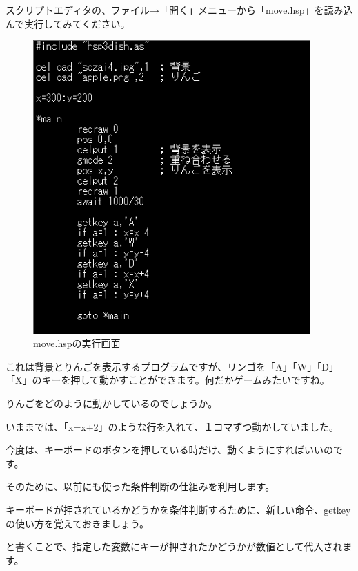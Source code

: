 スクリプトエディタの、ファイル→「開く」メニューから「move.hsp」を読み込んで実行してみてください。


\begin{figure}[H]
    \begin{center}
      \includegraphics[keepaspectratio,width=10.61cm,height=11.229cm]{text04-img/s_move.png}
      \caption{move.hspの実行画面}
    \end{center}
    \label{fig:prog_menu}
\end{figure}

これは背景とりんごを表示するプログラムですが、リンゴを「A」「W」「D」「X」のキーを押して動かすことができます。何だかゲームみたいですね。

りんごをどのように動かしているのでしょうか。

いままでは、「x=x+2」のような行を入れて、１コマずつ動かしていました。

今度は、キーボードのボタンを押している時だけ、動くようにすればいいのです。

そのために、以前にも使った条件判断の仕組みを利用します。

キーボードが押されているかどうかを条件判断するために、新しい命令、getkeyの使い方を覚えておきましょう。

\begin{description}
    \item {}
\end{description}

と書くことで、指定した変数にキーが押されたかどうかが数値として代入されます。

